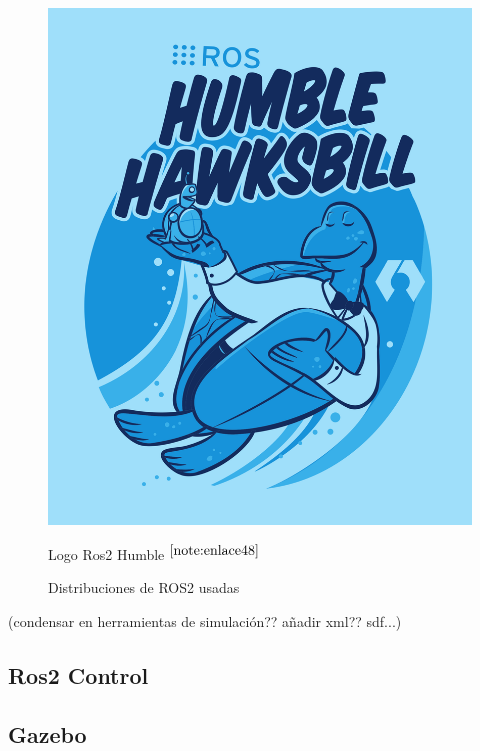 \begin{figure}[ht!]
\begin{minipage}{0.35\linewidth}
		\includegraphics[width=\linewidth]{figs/humble.png}
		\caption*{\centering Logo Ros2 Humble $^{\ref{note:enlace48}}$} %
	\end{minipage}
	\caption{Distribuciones de ROS2 usadas}
	\label{fig:rosdis}
\end{figure}


\setcounter{footnote}{47} %

\setcounter{footnote}{48} %


(condensar en herramientas de simulación?? añadir xml?? sdf...)
\subsection{Ros2 Control}

\subsection{Gazebo}


